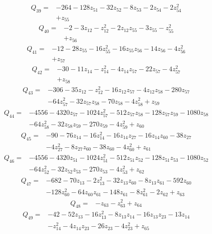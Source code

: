 \[\begin{aligned}Q_{39}={}&-264-128z_{51}-32z_{52}-8z_{53}-2z_{54}-2z_{54}^{2}
\\&+z_{55}
\end{aligned}\]
\[\begin{aligned}Q_{40}={}&-2-3z_{12}-z_{12}^{2}-2z_{12}z_{55}-3z_{55}-z_{55}^{2}
\\&+z_{56}
\end{aligned}\]
\[\begin{aligned}Q_{41}={}&-12-28z_{55}-16z_{55}^{2}-16z_{55}z_{56}-14z_{56}-4z_{56}^{2}
\\&+z_{57}
\end{aligned}\]
\[\begin{aligned}Q_{42}={}&-30-11z_{14}-z_{14}^{2}-4z_{14}z_{57}-22z_{57}-4z_{57}^{2}
\\&+z_{58}
\end{aligned}\]
\[\begin{aligned}Q_{43}={}&-306-35z_{12}-z_{12}^{2}-16z_{12}z_{57}-4z_{12}z_{58}-280z_{57}
\\&-64z_{57}^{2}-32z_{57}z_{58}-70z_{58}-4z_{58}^{2}+z_{59}
\end{aligned}\]
\[\begin{aligned}Q_{44}={}&-4556-4320z_{57}-1024z_{57}^{2}-512z_{57}z_{58}-128z_{57}z_{59}-1080z_{58}
\\&-64z_{58}^{2}-32z_{58}z_{59}-270z_{59}-4z_{59}^{2}+z_{60}
\end{aligned}\]
\[\begin{aligned}Q_{45}={}&-90-76z_{14}-16z_{14}^{2}-16z_{14}z_{27}-16z_{14}z_{60}-38z_{27}
\\&-4z_{27}^{2}-8z_{27}z_{60}-38z_{60}-4z_{60}^{2}+z_{61}
\end{aligned}\]
\[\begin{aligned}Q_{46}={}&-4556-4320z_{51}-1024z_{51}^{2}-512z_{51}z_{52}-128z_{51}z_{53}-1080z_{52}
\\&-64z_{52}^{2}-32z_{52}z_{53}-270z_{53}-4z_{53}^{2}+z_{62}
\end{aligned}\]
\[\begin{aligned}Q_{47}={}&-682-70z_{13}-2z_{13}^{2}-32z_{13}z_{60}-8z_{13}z_{61}-592z_{60}
\\&-128z_{60}^{2}-64z_{60}z_{61}-148z_{61}-8z_{61}^{2}-2z_{62}+z_{63}
\end{aligned}\]
\[\begin{aligned}Q_{48}={}&-z_{63}-z_{63}^{2}+z_{64}
\end{aligned}\]
\[\begin{aligned}Q_{49}={}&-42-52z_{13}-16z_{13}^{2}-8z_{13}z_{14}-16z_{13}z_{23}-13z_{14}
\\&-z_{14}^{2}-4z_{14}z_{23}-26z_{23}-4z_{23}^{2}+z_{65}
\end{aligned}\]
